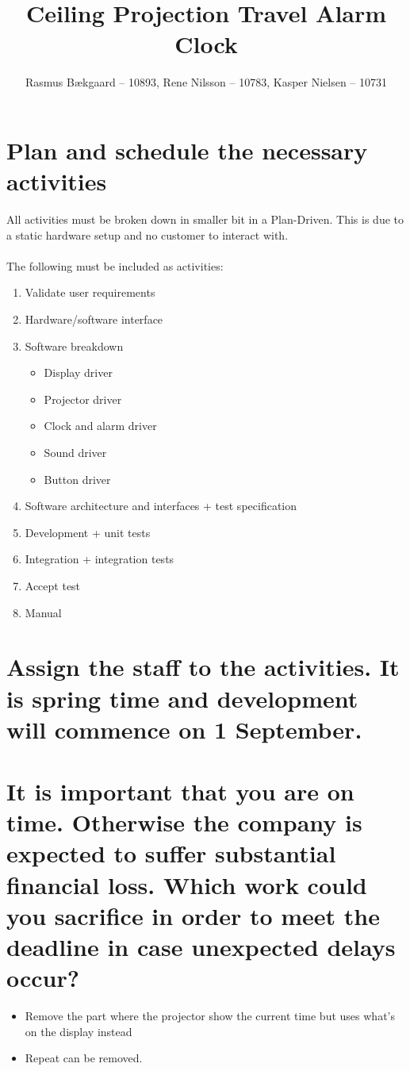 \documentclass[10pt]{article}
\title{Ceiling Projection Travel Alarm Clock}
\author{Rasmus Bækgaard -- 10893, Rene Nilsson -- 10783, Kasper Nielsen -- 10731}
\begin{document}
\maketitle


\section{Plan and schedule the necessary activities} 

All activities must be broken down in smaller bit in a Plan-Driven.
This is due to a static hardware setup and no customer to interact with.
\\
\\
The following must be included as activities:
\begin{enumerate}
	\item Validate user requirements
	\item Hardware/software interface
	\item Software breakdown
	\begin{itemize}
		\item Display driver
		\item Projector driver
		\item Clock and alarm driver
		\item Sound driver
		\item Button driver
	\end{itemize}
	\item Software architecture and interfaces + test specification
	\item Development + unit tests
	\item Integration + integration tests
	\item Accept test
	\item Manual
\end{enumerate}





\section{Assign the staff to the activities. It is spring time and development will commence on 1 September.}





\section{It is important that you are on time. 
	Otherwise the company is expected to suffer substantial financial loss. 
	Which work could you sacrifice in order to meet the deadline in case unexpected delays occur?}

\begin{itemize}
	\item Remove the part where the projector show the current time but uses what's on the display instead
	\item Repeat can be removed.
\end{itemize}
\end{document}

